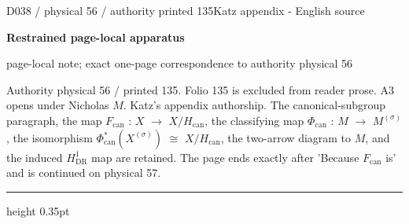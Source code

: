 \documentclass[9pt]{article}
\newcommand{\CanonText}[1]{\par{\fontsize{8.0}{9.35}\selectfont\RaggedRight #1\par}\vspace{2.2pt}}
\newcommand{\LayerTitle}{Restrained page-local apparatus}
\begin{document}
\noindent\begin{minipage}[t][\dimexpr\textheight-5pt\relax][t]{\textwidth}
{\sffamily\fontsize{7.3}{8.2}\selectfont\color{Quiet} D038 / physical 56 / authority printed 135\hfill Katz appendix - English source}
\par{}\vspace{4.5pt}
{\sffamily\fontsize{10.4}{11.6}\selectfont\bfseries\color{Accent} \LayerTitle}
\par{\sffamily\fontsize{6.7}{7.7}\selectfont\color{Quiet} page-local note; exact one-page correspondence to authority physical 56}
\vspace{5pt}
\CanonText{Authority physical 56 / printed 135. Folio 135 is excluded from reader prose. A3 opens under Nicholas \(M\). Katz's appendix authorship. The canonical-subgroup paragraph, the map \(F_{\mathrm{can}}\) : \(X\) \(\to{}\) \(X/H_{\mathrm{can}}\), the classifying map \(\Phi{}_{\mathrm{can}}\) : \(M\) \(\to{}\) \(M^{(\sigma{})}\), the isomorphism \(\Phi{}_{\mathrm{can}}^{*}(X^{(\sigma{})})\) \(\cong{}\) \(X/H_{\mathrm{can}}\), the two-arrow diagram to \(M\), and the induced \(H^{1}_{\mathrm{DR}}\) map are retained. The page ends exactly after 'Because \(F_{\mathrm{can}}\) is' and is continued on physical 57.}
\vfill
{\color{Accent}\hrule height 0.35pt}\vspace{3pt}
\end{minipage}
\newpage
\end{document}
